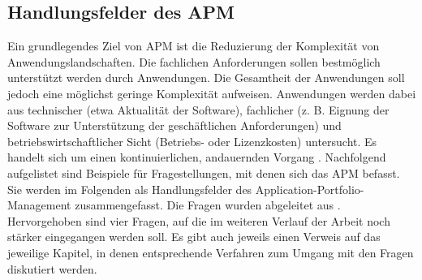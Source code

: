 \subsection {Handlungsfelder des APM}
Ein grundlegendes Ziel von APM ist die Reduzierung der Komplexität von Anwendungslandschaften. Die fachlichen Anforderungen sollen bestmöglich unterstützt werden durch Anwendungen. Die Gesamtheit der Anwendungen soll jedoch eine möglichst geringe Komplexität aufweisen. Anwendungen werden dabei aus technischer (etwa Aktualität der Software), fachlicher (z. B. Eignung der Software zur Unterstützung der geschäftlichen Anforderungen) und betriebswirtschaftlicher Sicht (Betriebs- oder Lizenzkosten) untersucht. Es handelt sich um einen kontinuierlichen, andauernden Vorgang \cite{schoder}. Nachfolgend aufgelistet sind Beispiele für Fragestellungen, mit denen sich das APM befasst. Sie werden im Folgenden als Handlungsfelder des Application-Portfolio-Management zusammengefasst. Die Fragen wurden abgeleitet aus \cite{apm}. Hervorgehoben sind vier Fragen, auf die im weiteren Verlauf der Arbeit noch stärker eingegangen werden soll. Es gibt auch jeweils einen Verweis auf das jeweilige Kapitel, in denen entsprechende Verfahren zum Umgang mit den Fragen diskutiert werden.

